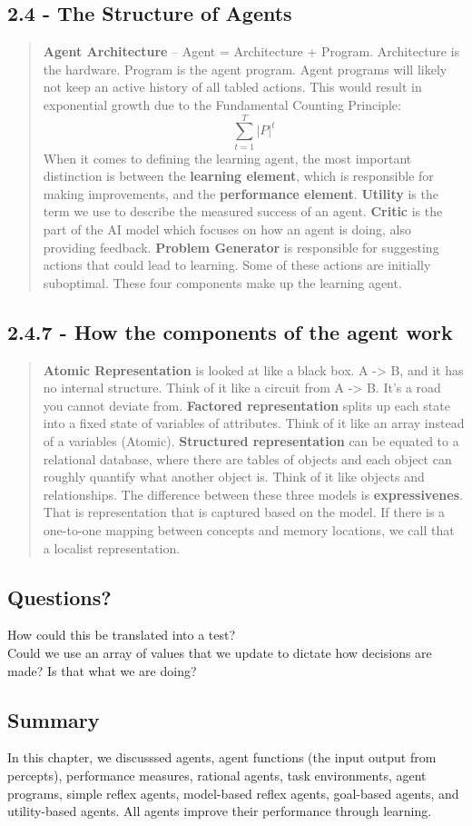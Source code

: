 \documentclass{article}
\begin{document}
\subsection{2.4 - The Structure of Agents}
\begin{quote}
    \textbf{Agent Architecture} – Agent = Architecture + Program. Architecture is the hardware. Program is the agent program. Agent programs will likely not keep an active history of all tabled actions. This would result in exponential growth due to the Fundamental Counting Principle:
    \[
        \sum_{t=1}^{T} |P|^t
    \]
    When it comes to defining the learning agent, the most important distinction is between the \textbf{learning element}, which is responsible for making improvements, and the \textbf{performance element}.
    \textbf{Utility} is the term we use to describe the measured success of an agent. \textbf{Critic} is the part of the AI model which focuses on how an agent is doing, also providing feedback.
    \textbf{Problem Generator} is responsible for suggesting actions that could lead to learning. Some of these actions are initially suboptimal. These four components make up the learning agent.
\end{quote}
\subsection{2.4.7 - How the components of the agent work}
\begin{quote}
    \textbf{Atomic Representation} is looked at like a black box. A -> B, and it has no internal structure. Think of it like a circuit from A -> B. It's a road you cannot deviate from.
    \textbf{Factored representation} splits up each state into a fixed state of variables of attributes. Think of it like an array instead of a variables (Atomic). \textbf{Structured representation}
    can be equated to a relational database, where there are tables of objects and each object can roughly quantify what another object is. Think of it like objects and relationships. The difference between
    these three models is \textbf{expressivenes}. That is representation that is captured based on the model. If there is a one-to-one mapping between concepts and memory locations, we call that a localist representation.
\end{quote}
\subsection{Questions?}
How could this be translated into a test?
\\ Could we use an array of values that we update to dictate how decisions are made? Is that what we are doing?
\subsection{Summary}
In this chapter, we discusssed agents, agent functions (the input output from percepts), performance measures, rational agents,
task environments, agent programs, simple reflex agents, model-based reflex agents, goal-based agents, and utility-based agents. All agents improve their performance through learning.
\end{document}
